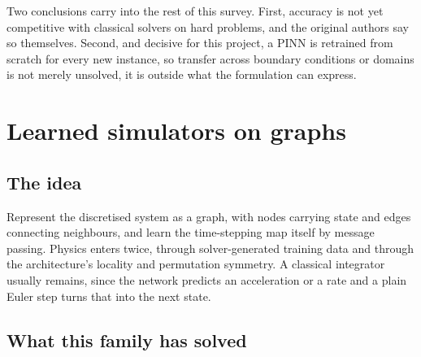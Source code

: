 \documentclass[11pt, a4paper]{article}
\begin{document}
Two conclusions carry into the rest of this survey. First, accuracy is not
yet competitive with classical solvers on hard problems, and the original
authors say so themselves. Second, and decisive for this project, a PINN is
retrained from scratch for every new instance, so transfer across boundary
conditions or domains is not merely unsolved, it is outside what the
formulation can express.

\section{Learned simulators on graphs}
\label{sec:simulators}

\subsection{The idea}

Represent the discretised system as a graph, with nodes carrying state and
edges connecting neighbours, and learn the time-stepping map itself by
message passing. Physics enters twice, through solver-generated training data
and through the architecture's locality and permutation symmetry. A classical
integrator usually remains, since the network predicts an acceleration or a
rate and a plain Euler step turns that into the next state.

\subsection{What this family has solved}
\end{document}
